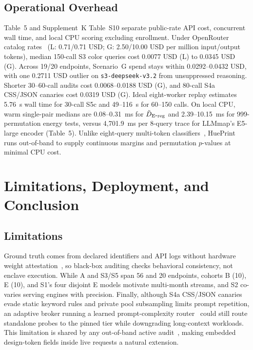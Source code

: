 \subsection{Operational Overhead}
Table~5 and Supplement~K Table~S10 separate public-rate API cost, concurrent wall time, and local CPU scoring excluding enrollment. Under OpenRouter catalog rates~\cite{ref30} (L: 0.71/0.71 USD; G: 2.50/10.00 USD per million input/output tokens), median 150-call S3 color queries cost 0.0077 USD (L) to 0.0345 USD (G). Across 19/20 endpoints, Scenario~G spend stays within 0.0292--0.0432 USD, with one 0.2711 USD outlier on \texttt{s3-deepseek-v3.2} from unsuppressed reasoning. Shorter 30--60-call audits cost 0.0068--0.0188 USD (G), and 80-call S4a CSS/JSON canaries cost 0.0319 USD (G). Ideal eight-worker replay estimates 5.76~s wall time for 30-call S5c and 49--116~s for 60--150 calls. On local CPU, warm single-pair medians are 0.08--0.31~ms for $\tilde D_{\mathrm{E\mbox{-}reg}}{}$ and 2.39--10.15~ms for 999-permutation energy tests, versus 4,701.9~ms per 8-query trace for LLMmap's E5-large encoder (Table~5). Unlike eight-query multi-token classifiers~\cite{ref16}, HuePrint runs out-of-band to supply continuous margins and permutation $p$-values at minimal CPU cost.

\section{Limitations, Deployment, and Conclusion}

\subsection{Limitations}
Ground truth comes from declared identifiers and API logs without hardware weight attestation~\cite{ref5}, so black-box auditing checks behavioral consistency, not enclave execution. While A and S3/S5 span 56 and 20 endpoints, cohorts B (10), E (10), and S1's four disjoint E models motivate multi-month streams, and S2 co-varies serving engines with precision. Finally, although S4a CSS/JSON canaries evade static keyword rules and private pool subsampling limits prompt repetition, an adaptive broker running a learned prompt-complexity router~\cite{ref1,ref2,ref5} could still route standalone probes to the pinned tier while downgrading long-context workloads. This limitation is shared by any out-of-band active audit~\cite{ref4,ref7,ref16}, making embedded design-token fields inside live requests a natural extension.


